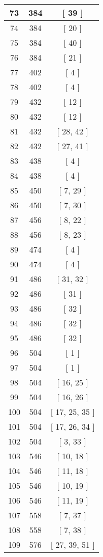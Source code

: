 \begin{center}
\begin{longtable}[H]{|| c c c ||}
\hline
73 & 384 & [ 39 ] \\ 
\hline
74 & 384 & [ 20 ] \\ 
\hline
75 & 384 & [ 40 ] \\ 
\hline
76 & 384 & [ 21 ] \\ 
\hline
77 & 402 & [ 4 ] \\ 
\hline
78 & 402 & [ 4 ] \\ 
\hline
79 & 432 & [ 12 ] \\ 
\hline
80 & 432 & [ 12 ] \\ 
\hline
81 & 432 & [ 28, 42 ] \\ 
\hline
82 & 432 & [ 27, 41 ] \\ 
\hline
83 & 438 & [ 4 ] \\ 
\hline
84 & 438 & [ 4 ] \\ 
\hline
85 & 450 & [ 7, 29 ] \\ 
\hline
86 & 450 & [ 7, 30 ] \\ 
\hline
87 & 456 & [ 8, 22 ] \\ 
\hline
88 & 456 & [ 8, 23 ] \\ 
\hline
89 & 474 & [ 4 ] \\ 
\hline
90 & 474 & [ 4 ] \\ 
\hline
91 & 486 & [ 31, 32 ] \\ 
\hline
92 & 486 & [ 31 ] \\ 
\hline
93 & 486 & [ 32 ] \\ 
\hline
94 & 486 & [ 32 ] \\ 
\hline
95 & 486 & [ 32 ] \\ 
\hline
96 & 504 & [ 1 ] \\ 
\hline
97 & 504 & [ 1 ] \\ 
\hline
98 & 504 & [ 16, 25 ] \\ 
\hline
99 & 504 & [ 16, 26 ] \\ 
\hline
100 & 504 & [ 17, 25, 35 ] \\ 
\hline
101 & 504 & [ 17, 26, 34 ] \\ 
\hline
102 & 504 & [ 3, 33 ] \\ 
\hline
103 & 546 & [ 10, 18 ] \\ 
\hline
104 & 546 & [ 11, 18 ] \\ 
\hline
105 & 546 & [ 10, 19 ] \\ 
\hline
106 & 546 & [ 11, 19 ] \\ 
\hline
107 & 558 & [ 7, 37 ] \\ 
\hline
108 & 558 & [ 7, 38 ] \\ 
\hline
109 & 576 & [ 27, 39, 51 ] \\ 

\end{longtable}
\end{center}
